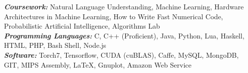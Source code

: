 \documentclass[9pt]{article}
\newenvironment{changemargin}[2]{%
  \begin{list}{}{%
    \setlength{\topsep}{0pt}%
    \setlength{\leftmargin}{#1}%
    \setlength{\rightmargin}{#2}%
    \setlength{\listparindent}{\parindent}%
    \setlength{\itemindent}{\parindent}%
    \setlength{\parsep}{\parskip}%
  }%
  \item[]}{\end{list}
}
\newenvironment{body} {
	\vspace*{-16pt}
	\begin{changemargin}{-0.6in}{-0.65in}
  }	
	{\end{changemargin}
}
\begin{document}
\vspace{3 mm}
\begin{body}
	\vspace{14pt}
	\begin{changemargin}{0.15in}{0.15in}
	\emph{\textbf{Coursework:}} Natural Language Understanding, Machine Learning, Hardware Architectures in Machine Learning, How to Write Fast Numerical Code, Probabilistic Artificial Intelligence, Algorithms Lab \\
	\emph{\textbf{Programming Languages: }}{} C, C++ (Proficient), Java, Python, Lua, Haskell, HTML, PHP, Bash Shell, Node.js\\
	\emph{\textbf{Software: }}{} Torch7, Tensorflow, CUDA (cuBLAS), Caffe, MySQL, MongoDB, GIT, MIPS Assembly, \LaTeX, Gnuplot, Amazon Web Service \\
	\end{changemargin}
\end{body}
\end{document}
